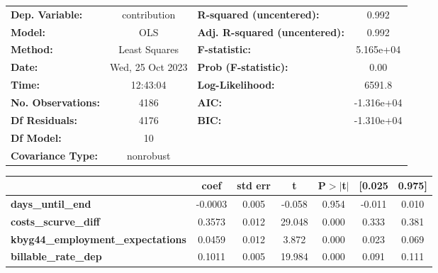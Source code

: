 \begin{center}
\begin{tabular}{lclc}
\toprule
\textbf{Dep. Variable:}                   &   contribution   & \textbf{  R-squared (uncentered):}      &     0.992   \\
\textbf{Model:}                           &       OLS        & \textbf{  Adj. R-squared (uncentered):} &     0.992   \\
\textbf{Method:}                          &  Least Squares   & \textbf{  F-statistic:       }          & 5.165e+04   \\
\textbf{Date:}                            & Wed, 25 Oct 2023 & \textbf{  Prob (F-statistic):}          &     0.00    \\
\textbf{Time:}                            &     12:43:04     & \textbf{  Log-Likelihood:    }          &    6591.8   \\
\textbf{No. Observations:}                &        4186      & \textbf{  AIC:               }          & -1.316e+04  \\
\textbf{Df Residuals:}                    &        4176      & \textbf{  BIC:               }          & -1.310e+04  \\
\textbf{Df Model:}                        &          10      & \textbf{                     }          &             \\
\textbf{Covariance Type:}                 &    nonrobust     & \textbf{                     }          &             \\
\bottomrule
\end{tabular}
\begin{tabular}{lcccccc}
                                          & \textbf{coef} & \textbf{std err} & \textbf{t} & \textbf{P$> |$t$|$} & \textbf{[0.025} & \textbf{0.975]}  \\
\midrule
\textbf{days\_until\_end}                 &      -0.0003  &        0.005     &    -0.058  &         0.954        &       -0.011    &        0.010     \\
\textbf{costs\_scurve\_diff}              &       0.3573  &        0.012     &    29.048  &         0.000        &        0.333    &        0.381     \\
\textbf{kbyg44\_employment\_expectations} &       0.0459  &        0.012     &     3.872  &         0.000        &        0.023    &        0.069     \\
\textbf{billable\_rate\_dep}              &       0.1011  &        0.005     &    19.984  &         0.000        &        0.091    &        0.111     \\

\end{tabular}
\end{center}
